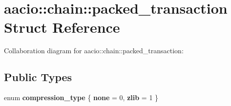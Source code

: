 \hypertarget{structaacio_1_1chain_1_1packed__transaction}{}\section{aacio\+:\+:chain\+:\+:packed\+\_\+transaction Struct Reference}
\label{structaacio_1_1chain_1_1packed__transaction}


Collaboration diagram for aacio\+:\+:chain\+:\+:packed\+\_\+transaction\+:
\subsection*{Public Types}
\begin{DoxyCompactItemize}
\item 
\mbox{\label{structaacio_1_1chain_1_1packed__transaction_aed0cdbb13aefc07dc47858493fda479c}} 
enum {\bfseries compression\+\_\+type} \{ {\bfseries none} = 0, 
{\bfseries zlib} = 1
 \}
\end{DoxyCompactItemize}
